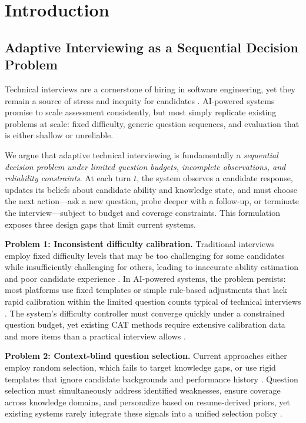﻿\documentclass[final,3p,times,authoryear]{elsarticle}
\begin{document}
\section{Introduction}

\subsection{Adaptive Interviewing as a Sequential Decision Problem}

\noindent Technical interviews are a cornerstone of hiring in software engineering, yet they remain a source of stress and inequity for candidates \cite{kim2024interview}. AI-powered systems promise to scale assessment consistently, but most simply replicate existing problems at scale: fixed difficulty, generic question sequences, and evaluation that is either shallow or unreliable.

We argue that adaptive technical interviewing is fundamentally a \emph{sequential decision problem under limited question budgets, incomplete observations, and reliability constraints}. At each turn $t$, the system observes a candidate response, updates its beliefs about candidate ability and knowledge state, and must choose the next action---ask a new question, probe deeper with a follow-up, or terminate the interview---subject to budget and coverage constraints. This formulation exposes three design gaps that limit current systems.

\noindent \textbf{Problem 1: Inconsistent difficulty calibration.} Traditional interviews employ fixed difficulty levels that may be too challenging for some candidates while insufficiently challenging for others, leading to inaccurate ability estimation and poor candidate experience \cite{van2006computerized}. In AI-powered systems, the problem persists: most platforms use fixed templates or simple rule-based adjustments that lack rapid calibration within the limited question counts typical of technical interviews \cite{kim2024interview}. The system's difficulty controller must converge quickly under a constrained question budget, yet existing CAT methods require extensive calibration data and more items than a practical interview allows \cite{van2006computerized}.

\noindent \textbf{Problem 2: Context-blind question selection.} Current approaches either employ random selection, which fails to target knowledge gaps, or use rigid templates that ignore candidate backgrounds and performance history \cite{chen2022personalization}. Question selection must simultaneously address identified weaknesses, ensure coverage across knowledge domains, and personalize based on resume-derived priors, yet existing systems rarely integrate these signals into a unified selection policy \cite{li2022resume,vanlehn2011relative}.
\end{document}
